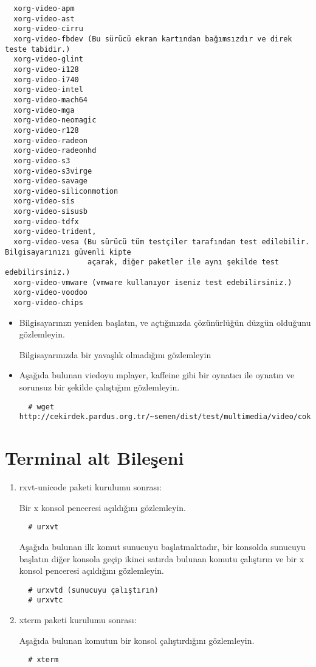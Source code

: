 \documentclass[a4paper,10pt]{article}
\begin{document}
\begin{enumerate}
\begin{verbatim}
  xorg-video-apm 
  xorg-video-ast
  xorg-video-cirru
  xorg-video-fbdev (Bu sürücü ekran kartından bağımsızdır ve direk teste tabidir.)
  xorg-video-glint
  xorg-video-i128
  xorg-video-i740
  xorg-video-intel
  xorg-video-mach64
  xorg-video-mga
  xorg-video-neomagic
  xorg-video-r128
  xorg-video-radeon
  xorg-video-radeonhd
  xorg-video-s3
  xorg-video-s3virge
  xorg-video-savage
  xorg-video-siliconmotion
  xorg-video-sis
  xorg-video-sisusb
  xorg-video-tdfx
  xorg-video-trident,
  xorg-video-vesa (Bu sürücü tüm testçiler tarafından test edilebilir. Bilgisayarınızı güvenli kipte
                   açarak, diğer paketler ile aynı şekilde test edebilirsiniz.)
  xorg-video-vmware (vmware kullanıyor iseniz test edebilirsiniz.)
  xorg-video-voodoo
  xorg-video-chips
\end{verbatim}

\begin{itemize}
  \item Bilgisayarınızı yeniden başlatın, ve açtığınızda çözünürlüğün düzgün olduğunu gözlemleyin.

  Bilgisayarınızda bir yavaşlık olmadığını gözlemleyin
  \item Aşağıda bulunan viedoyu mplayer, kaffeine gibi bir oynatıcı ile oynatın ve sorunsuz bir şekilde çalıştığını gözlemleyin.
  \begin{verbatim}
  # wget http://cekirdek.pardus.org.tr/~semen/dist/test/multimedia/video/cokluortam/DVD.mpg
  \end{verbatim}
\end{itemize}

\end{enumerate}

\section{Terminal alt Bileşeni}
\begin{enumerate}
  \item rxvt-unicode paketi kurulumu sonrası:

  Bir x konsol penceresi açıldığını gözlemleyin.
  \begin{verbatim}
  # urxvt
  \end{verbatim}

  Aşağıda bulunan ilk komut sunucuyu başlatmaktadır, bir konsolda sunucuyu başlatın diğer konsola geçip ikinci satırda bulunan komutu çalıştırın ve bir x konsol penceresi açıldığını gözlemleyin.
  \begin{verbatim}
  # urxvtd (sunucuyu çalıştırın)
  # urxvtc
  \end{verbatim}

  \item xterm paketi kurulumu sonrası:

  Aşağıda bulunan komutun bir konsol çalıştırdığını gözlemleyin.
  \begin{verbatim}
  # xterm
  \end{verbatim}
\end{enumerate}
\end{document}
